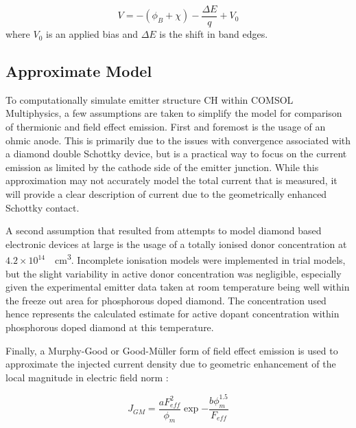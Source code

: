 \begin{refsection}
\begin{equation}
    V = - \left( \phi_{B} + \chi \right) - \frac{\Delta E}{q} + V_{0}
\end{equation}
\noindent where $V_{0}$ is an applied bias and $\Delta E$ is the shift in band edges.

\subsection{Approximate Model}
To computationally simulate emitter structure CH within COMSOL Multiphysics, a few assumptions are taken to simplify the model for comparison of thermionic and field effect emission. First and foremost is the usage of an ohmic anode. This is primarily due to the issues with convergence associated with a diamond double Schottky device, but is a practical way to focus on the current emission as limited by the cathode side of the emitter junction. While this approximation may not accurately model the total current that is measured, it will provide a clear description of current due to the geometrically enhanced Schottky contact.

A second assumption that resulted from attempts to model diamond based electronic devices at large is the usage of a totally ionised donor concentration at $4.2\times10^{14}$~\si{\per\centi\metre\cubed}. Incomplete ionisation models were implemented in trial models, but the slight variability in active donor concentration was negligible, especially given the experimental emitter data taken at room temperature being well within the freeze out area for phosphorous doped diamond. The concentration used hence represents the calculated estimate for active dopant concentration within phosphorous doped diamond at this temperature.

Finally, a Murphy-Good or Good-M\"{u}ller form of field effect emission is used to approximate the injected current density due to geometric enhancement of the local magnitude in electric field norm \cite{Good1956, Kyritsakis2015}:

\begin{equation}
    J_{GM} = \frac{aF_{eff}^{2}}{\phi_{m}}\exp{-\frac{b\phi_{m}^{1.5}}{F_{eff}}}
    \label{eq:good-muller}
\end{equation}


\end{refsection}
